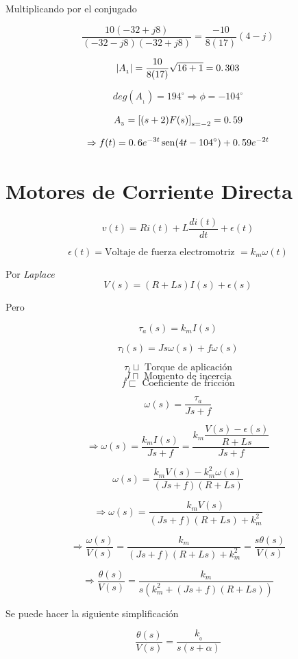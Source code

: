 Multiplicando por el conjugado

$$\dfrac{10(-32 + j8)}{(-32 - j8)(-32 + j8)} = \dfrac{-10}{8(17)}(4 - j)$$

$$|A_{_1}| = \dfrac{10}{8(17)} \sqrt{16 + 1} = 0\ldotp303$$

$$deg(A_{_1}) = 194^\circ \Rightarrow \phi = -104^\circ$$

$$A_{_3} = \left[ (s + 2)F(s) \right]_{s = -2} = 0\ldotp59$$

$$\Rightarrow f(t) = 0\ldotp6 e^{-3t} \mathop{\rm sen}\nolimits (4t - 104^\circ) + 0\ldotp59 e^{-2t}$$



\section{Motores de Corriente Directa}


$$v(t) = Ri(t) + L \dfrac{di(t)}{dt} + \epsilon(t)$$

$$\epsilon(t) = \mbox{Voltaje de fuerza electromotriz } = k_{m}\omega(t)$$ 

Por \textit{Laplace}
$$V(s) = (R + Ls)I(s) + \epsilon(s)$$

Pero

$$\tau_{a}(s) = k_{m}I(s)$$

$$\tau_{l}(s) = Js\omega(s) + f\omega (s)$$

$$\tau_{l} \sqcup \mbox{ Torque de aplicación}$$
$$J \sqcap \mbox{ Momento de incercia}$$
$$f \sqsubset \mbox{ Coeficiente de fricción}$$


$$\omega(s) = \dfrac{\tau_{a}}{Js + f}$$

$$\Rightarrow \omega(s) = \dfrac{k_{m}I(s)}{Js + f} = \dfrac{k_{m} \dfrac{V(s) - \epsilon (s)}{R + Ls}}{Js + f}$$

$$\omega(s) = \dfrac{k_{m} V(s) - k_{m}^{2}\omega(s)}{(Js + f)(R + Ls)}$$

$$\Rightarrow \omega(s) = \dfrac{k_{m}V(s)}{(Js + f)(R + Ls) + k_{m}^{2}}$$

$$\Rightarrow \dfrac{\omega(s)}{V(s)} = \dfrac{k_{m}}{(Js + f)(R + Ls) + k_{m}^{2}} = \dfrac{s\theta(s)}{V(s)}$$

$$\Rightarrow \dfrac{\theta(s)}{V(s)} = \dfrac{k_{m}}{s(k_{m}^{2} + (Js + f)(R + Ls))}$$

Se puede hacer la siguiente simplificación

$$\dfrac{\theta(s)}{V(s)} = \dfrac{k_{_{0}}}{s(s + \alpha)}$$

